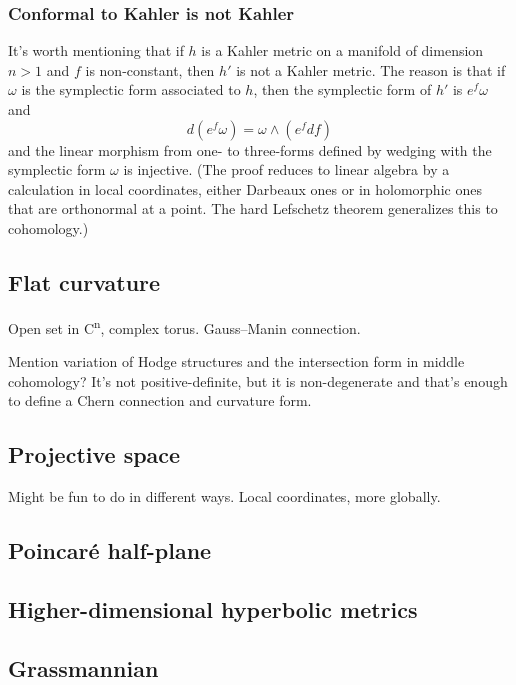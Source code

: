 \documentclass[11pt]{article}
\begin{document}
\subsubsection{Conformal to Kahler is not Kahler}
\label{sec:org7b1cfdf}

It's worth mentioning that if \(h\) is a Kahler metric on a manifold of dimension \(n > 1\) and \(f\) is non-constant, then \(h'\) is not a Kahler metric. The reason is that if \(\omega\) is the symplectic form associated to \(h\), then the symplectic form of \(h'\) is \(e^f \omega\) and
$$
d(e^f \omega) = \omega \wedge (e^f df)
$$
and the linear morphism from one- to three-forms defined by wedging with the symplectic form \(\omega\) is injective. (The proof reduces to linear algebra by a calculation in local coordinates, either Darbeaux ones or in holomorphic ones that are orthonormal at a point. The hard Lefschetz theorem generalizes this to cohomology.)

\subsection{Flat curvature}
\label{sec:org504b250}

Open set in C\textsuperscript{n}, complex torus. Gauss--Manin connection.

Mention variation of Hodge structures and the intersection form in middle cohomology? It's not positive-definite, but it is non-degenerate and that's enough to define a Chern connection and curvature form.

\subsection{Projective space}
\label{sec:orgcfabeed}

Might be fun to do in different ways. Local coordinates, more globally.

\subsection{Poincaré half-plane}
\label{sec:orgfbd87cb}

\subsection{Higher-dimensional hyperbolic metrics}
\label{sec:org21fa1aa}

\subsection{Grassmannian}
\label{sec:org34425b6}
\end{document}
